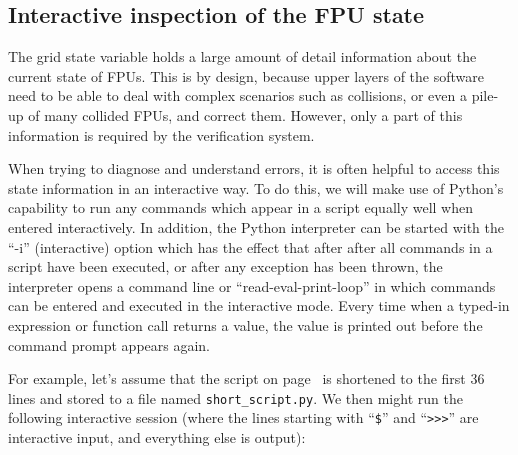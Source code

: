 \documentclass[11pt,a4paper]{scrartcl}
\begin{document}
\subsection{Interactive inspection of the FPU state}
\label{sec:fpustate}
The grid state variable holds a large amount of detail information
about the current state of FPUs. This is by design, because upper
layers of the software need to be able to deal with complex scenarios
such as collisions, or even a pile-up of many collided FPUs, and
correct them. However, only a part of this information is required by
the verification system.

When trying to diagnose and understand errors, it is often helpful to
access this state information in an interactive way.  To do this, we
will make use of Python's capability to run any commands which appear
in a script equally well when entered interactively. In addition, the
Python interpreter can be started with the ``-i'' (interactive) option
which has the effect that after after all commands in a script have
been executed, or after any exception has been thrown, the interpreter
opens a command line or ``read-eval-print-loop'' in which commands can
be entered and executed in the interactive mode. Every time when a
typed-in expression or function call returns a value, the value is
printed out before the command prompt appears again.

For example, let's assume that the script on
page~\pageref{sec:minimalexample} is shortened to the first 36 lines
and stored to a file named \texttt{short\_script.py}. We then might
run the following interactive session (where the lines starting with
``\texttt{\$}'' and ``\verb+>>>+'' are interactive input, and
everything else is output):
\end{document}
